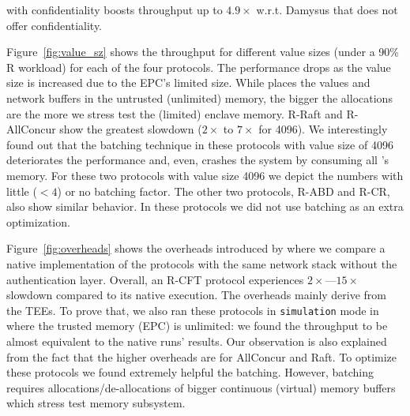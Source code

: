 \projecttitle{} with confidentiality boosts throughput up to $4.9\times$ w.r.t. Damysus that does not offer confidentiality.%


 Figure~\ref{fig:value_sz} shows the throughput for different value sizes (under a 90\% R workload) for each of the four protocols. The performance drops as the value size is increased due to the EPC's limited size. While \projecttitle{} places the values and network buffers in the untrusted (unlimited) memory, the bigger the allocations are the more we stress test the (limited) enclave memory. R-Raft and R-AllConcur show the greatest slowdown ($2\times$ to $7\times$ for \SI{4096}{\byte}). We interestingly found out that the batching technique in these protocols with value size of \SI{4096}{\byte} deteriorates the performance and, even, crashes the system by consuming all \scone{}'s memory. For these two protocols with value size \SI{4096}{\byte} we depict the numbers with little ($< 4$) or no batching factor. The other two protocols, R-ABD and R-CR, also show similar behavior. In these protocols we did not use batching as an extra optimization. %





 Figure~\ref{fig:overheads} shows the overheads introduced by  \projecttitle{} where we compare a native implementation of the protocols with the same network stack without the authentication layer. Overall, an R-CFT protocol experiences $2\times$---$15\times$ slowdown compared to its native execution. The overheads mainly derive from the TEEs. To prove that, we also ran these protocols in \texttt{simulation} mode in \scone{} where the trusted memory (EPC) is unlimited: we found the throughput to be almost equivalent to the native runs' results. Our observation is also explained from the fact that the higher overheads are for AllConcur and Raft. To optimize these protocols we found extremely helpful the batching. However, batching requires allocations/de-allocations of bigger continuous (virtual) memory buffers which stress test \scone{} memory subsystem.


